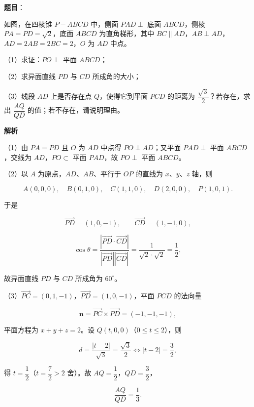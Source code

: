 \begin{answer}

\textbf{题目}：

如图，在四棱锥 $P-ABCD$ 中，侧面 $PAD\perp$ 底面 $ABCD$，侧棱 $PA=PD=\sqrt2$，底面 $ABCD$ 为直角梯形，其中 $BC\parallel AD$，$AB\perp AD$，$AD=2AB=2BC=2$，$O$ 为 $AD$ 中点。

（1）求证：$PO\perp$ 平面 $ABCD$；

（2）求异面直线 $PD$ 与 $CD$ 所成角的大小；

（3）线段 $AD$ 上是否存在点 $Q$，使得它到平面 $PCD$ 的距离为 $\dfrac{\sqrt3}{2}$？若存在，求出 $\dfrac{AQ}{QD}$ 的值；若不存在，请说明理由。
\nopagebreak[4]
\begin{center}\end{center}
\nopagebreak[4]
\textbf{解析}

（1）由 $PA=PD$ 且 $O$ 为 $AD$ 中点得 $PO\perp AD$；又平面 $PAD\perp$ 平面 $ABCD$，交线为 $AD$，$PO\subset$ 平面 $PAD$，故 $PO\perp$ 平面 $ABCD$。

（2）以 $A$ 为原点，$AD$、$AB$、平行于 $OP$ 的直线为 $x$、$y$、$z$ 轴，则

\nopagebreak[4]
\[A(0,0,0),\quad B(0,1,0),\quad C(1,1,0),\quad D(2,0,0),\quad P(1,0,1).\]

于是

\nopagebreak[4]
\[\overrightarrow{PD}=(1,0,-1),\qquad \overrightarrow{CD}=(1,-1,0),\]

\nopagebreak[4]
\[\cos\theta=\frac{|\overrightarrow{PD}\cdot\overrightarrow{CD}|}{|\overrightarrow{PD}||\overrightarrow{CD}|}=\frac1{\sqrt2\cdot\sqrt2}=\frac12,\]

故异面直线 $PD$ 与 $CD$ 所成角为 $60^\circ$。

（3）$\overrightarrow{PC}=(0,1,-1)$，$\overrightarrow{PD}=(1,0,-1)$，平面 $PCD$ 的法向量

\nopagebreak[4]
\[\boldsymbol n=\overrightarrow{PC}\times\overrightarrow{PD}=(-1,-1,-1),\]

平面方程为 $x+y+z=2$。设 $Q(t,0,0)$（$0\leqslant t\leqslant2$），则

\nopagebreak[4]
\[d=\frac{|t-2|}{\sqrt3}=\frac{\sqrt3}2\iff |t-2|=\frac32,\]

得 $t=\dfrac12$（$t=\dfrac72>2$ 舍）。故 $AQ=\dfrac12$，$QD=\dfrac32$，

\nopagebreak[4]
\[\frac{AQ}{QD}=\frac13.\]


\end{answer}
